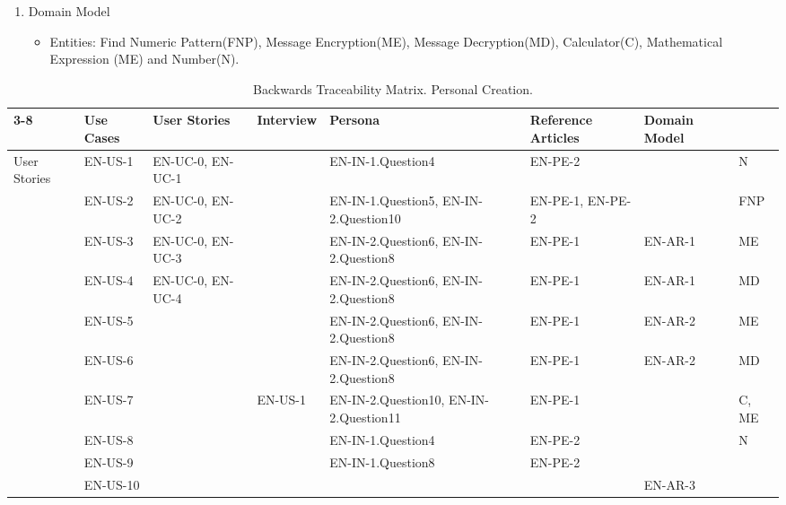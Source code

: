 \documentclass{report}
\begin{document}
\begin{enumerate}
    \item Domain Model
        \begin{itemize}
        \item Entities: Find Numeric Pattern(FNP), Message Encryption(ME), Message Decryption(MD), Calculator(C), Mathematical Expression (ME) and Number(N).
        \end{itemize}
        
\end{enumerate}
\begin{table}[H]
\begin{tabular}{ | m{3em} | m{1.5cm}| m{1.5cm}| m{1.5cm}| m{3cm} | m{1.8cm} | m{1.5cm} | m{1.5cm} |} 
\cline{3-8}
\multicolumn{2}{ c |}{}& Use Cases & User Stories & Interview & Persona & Reference Articles & Domain Model \\ 
\hline
\multirow {10}{2em}{User Stories} 
& EN-US-1 & EN-UC-0, EN-UC-1 & & EN-IN-1.Question4 & EN-PE-2 & & N\\ \cline{2-8}  
& EN-US-2 & EN-UC-0, EN-UC-2 & & EN-IN-1.Question5, EN-IN-2.Question10 & EN-PE-1, EN-PE-2 & &FNP \\ \cline{2-8}
& EN-US-3 & EN-UC-0, EN-UC-3 &  & EN-IN-2.Question6,  EN-IN-2.Question8 & EN-PE-1 & EN-AR-1 &ME\\ \cline{2-8}
& EN-US-4 & EN-UC-0, EN-UC-4 & & EN-IN-2.Question6,  EN-IN-2.Question8 & EN-PE-1 & EN-AR-1 &MD\\ \cline{2-8}
& EN-US-5 &  &  & EN-IN-2.Question6,  EN-IN-2.Question8 & EN-PE-1 & EN-AR-2 &ME\\ \cline{2-8}
& EN-US-6 &  &  & EN-IN-2.Question6,  EN-IN-2.Question8 & EN-PE-1 & EN-AR-2 &MD\\ \cline{2-8}
& EN-US-7 &  & EN-US-1  & EN-IN-2.Question10,  EN-IN-2.Question11 & EN-PE-1 & &C, ME \\ \cline{2-8}
& EN-US-8 &  & & EN-IN-1.Question4 & EN-PE-2 & &N\\ \cline{2-8}
& EN-US-9 &  &  & EN-IN-1.Question8 & EN-PE-2 & &\\ \cline{2-8}
& EN-US-10 &  &  & &  & EN-AR-3 &\\ 

\hline
\end{tabular}
\caption[Backwards Traceability Matrix]{Backwards Traceability Matrix. Personal Creation.}
\label{table:2}
\end{table}
\end{document}
